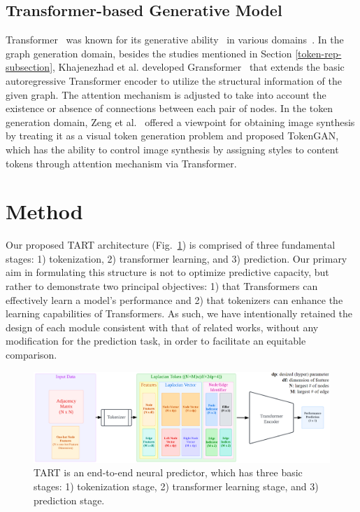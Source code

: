 \documentclass{article}
\begin{document}
\subsection{Transformer-based Generative Model}
Transformer~\cite{attentionIsAllYouNeed} was known for its generative ability~\cite{GANformer} in various domains~\cite{TransGAN, STransGAN, StyleSwin}. In the graph generation domain, besides the studies mentioned in Section \ref{token-rep-subsection}, Khajenezhad et al. developed Gransformer~\cite{Gransformer} that extends the basic autoregressive Transformer encoder to utilize the structural information of the given graph. The attention mechanism is adjusted to take into account the existence or absence of connections between each pair of nodes. In the token generation domain, Zeng et al.~\cite{TokenGAN} offered a viewpoint for obtaining image synthesis by treating it as a visual token generation problem and proposed TokenGAN, which has the ability to control image synthesis by assigning styles to content tokens through attention mechanism via Transformer.


\section{Method}
Our proposed TART architecture (Fig.~\ref{tart_pipeline}) is comprised of three fundamental stages: 1) tokenization, 2) transformer learning, and 3) prediction. Our primary aim in formulating this structure is not to optimize predictive capacity, but rather to demonstrate two principal objectives: 1) that Transformers can effectively learn a model's performance and 2) that tokenizers can enhance the learning capabilities of Transformers. As such, we have intentionally retained the design of each module consistent with that of related works, without any modification for the prediction task, in order to facilitate an equitable comparison.

\begin{figure}
  \centering
  \includegraphics[width=\textwidth]{images/tart_pipeline.png}
  \caption{TART is an end-to-end neural predictor, which has three basic stages: 1) tokenization stage, 2) transformer learning stage, and 3) prediction stage.}
  \label{tart_pipeline}
\end{figure}
\end{document}
